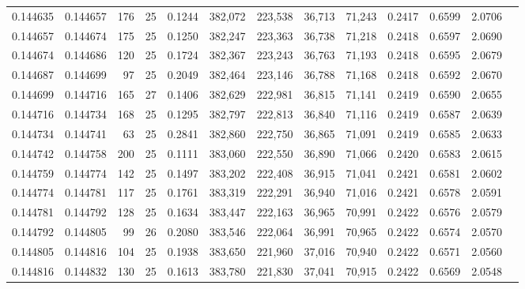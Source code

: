 \begin{tabular}{rrrrrrrrrrrrr}
0.144635 & 0.144657 &   176 &  25 &                                     0.1244 & 382,072 & 223,538 &  36,713 &  71,243 & 0.2417 & 0.6599 & 2.0706 \\
0.144657 & 0.144674 &   175 &  25 &                                     0.1250 & 382,247 & 223,363 &  36,738 &  71,218 & 0.2418 & 0.6597 & 2.0690 \\
0.144674 & 0.144686 &   120 &  25 &                                     0.1724 & 382,367 & 223,243 &  36,763 &  71,193 & 0.2418 & 0.6595 & 2.0679 \\
0.144687 & 0.144699 &    97 &  25 &                                     0.2049 & 382,464 & 223,146 &  36,788 &  71,168 & 0.2418 & 0.6592 & 2.0670 \\
0.144699 & 0.144716 &   165 &  27 &                                     0.1406 & 382,629 & 222,981 &  36,815 &  71,141 & 0.2419 & 0.6590 & 2.0655 \\
0.144716 & 0.144734 &   168 &  25 &                                     0.1295 & 382,797 & 222,813 &  36,840 &  71,116 & 0.2419 & 0.6587 & 2.0639 \\
0.144734 & 0.144741 &    63 &  25 &                                     0.2841 & 382,860 & 222,750 &  36,865 &  71,091 & 0.2419 & 0.6585 & 2.0633 \\
0.144742 & 0.144758 &   200 &  25 &                                     0.1111 & 383,060 & 222,550 &  36,890 &  71,066 & 0.2420 & 0.6583 & 2.0615 \\
0.144759 & 0.144774 &   142 &  25 &                                     0.1497 & 383,202 & 222,408 &  36,915 &  71,041 & 0.2421 & 0.6581 & 2.0602 \\
0.144774 & 0.144781 &   117 &  25 &                                     0.1761 & 383,319 & 222,291 &  36,940 &  71,016 & 0.2421 & 0.6578 & 2.0591 \\
0.144781 & 0.144792 &   128 &  25 &                                     0.1634 & 383,447 & 222,163 &  36,965 &  70,991 & 0.2422 & 0.6576 & 2.0579 \\
0.144792 & 0.144805 &    99 &  26 &                                     0.2080 & 383,546 & 222,064 &  36,991 &  70,965 & 0.2422 & 0.6574 & 2.0570 \\
0.144805 & 0.144816 &   104 &  25 &                                     0.1938 & 383,650 & 221,960 &  37,016 &  70,940 & 0.2422 & 0.6571 & 2.0560 \\
0.144816 & 0.144832 &   130 &  25 &                                     0.1613 & 383,780 & 221,830 &  37,041 &  70,915 & 0.2422 & 0.6569 & 2.0548 \\

\end{tabular}
